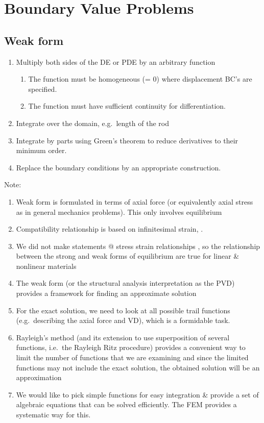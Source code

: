 \hypertarget{boundary-value-problems}{%
\section{Boundary Value Problems}\label{boundary-value-problems}}

\hypertarget{weak-form}{%
\subsection{Weak form}\label{weak-form}}

\begin{enumerate}
\def\labelenumi{\arabic{enumi}.}
\tightlist
\item
  Multiply both sides of the DE or PDE by an arbitrary function

  \begin{enumerate}
  \def\labelenumii{\arabic{enumii}.}
  \tightlist
  \item
    The function must be homogeneous (= 0) where displacement BC's are
    specified.
  \item
    The function must have sufficient continuity for differentiation.
  \end{enumerate}
\item
  Integrate over the domain, e.g.~length of the rod
\item
  Integrate by parts using Green's theorem to reduce derivatives to
  their minimum order.
\item
  Replace the boundary conditions by an appropriate construction.
\end{enumerate}

Note:
\begin{enumerate}
\def\labelenumi{\arabic{enumi}.}
\tightlist
\item
  Weak form is formulated in terms of axial force (or equivalently axial
  stress as in general mechanics problems). This only involves
  equilibrium
\item
  Compatibility relationship is based on infinitesimal strain, .
\item
  We did not make statements @ stress strain relationships , so the
  relationship between the strong and weak forms of equilibrium are true
  for linear \& nonlinear materials
\item
  The weak form (or the structural analysis interpretation as the PVD)
  provides a framework for finding an approximate solution
\item
  For the exact solution, we need to look at all possible trail
  functions (e.g.~describing the axial force and VD), which is a
  formidable task.
\item
  Rayleigh's method (and its extension to use superposition of several
  functions, i.e.~the Rayleigh Ritz procedure) provides a convenient way
  to limit the number of functions that we are examining and since the
  limited functions may not include the exact solution, the obtained
  solution will be an approximation
\item
  We would like to pick simple functions for easy integration \& provide
  a set of algebraic equations that can be solved efficiently. The FEM
  provides a systematic way for this.
\end{enumerate}
